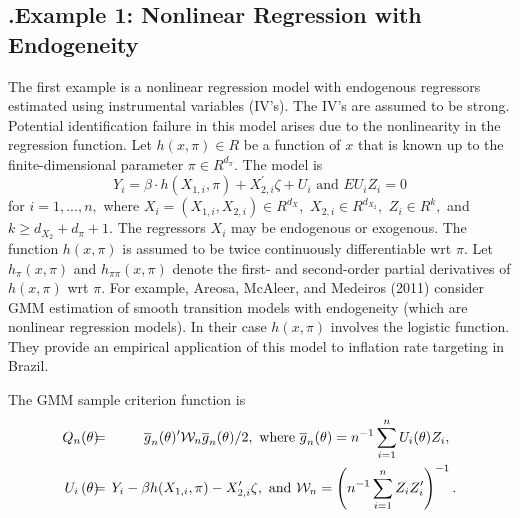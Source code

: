 \documentclass[12pt,titlepage,final,oneside,letterpaper]{article}
\begin{document}
\subsection{\hspace{-0.2in}\textbf{.}\hspace{0.18in}Example 1: Nonlinear
Regression with Endogeneity}

\hspace{0.25in}The first example is a nonlinear regression model with
endogenous regressors estimated using instrumental variables (IV's). The
IV's are assumed to be strong. Potential identification failure in this
model arises due to the nonlinearity in the regression function. Let $%
h(x,\pi )\in R$ be a function of $x$ that is known up to the
finite-dimensional parameter $\pi \in R^{d_{\pi }}.$ The model is%
\begin{equation}
Y_{i}=\beta \cdot h\left( X_{1,i},\pi \right) +X_{2,i}^{\prime }\zeta +U_{i}%
\text{ and }EU_{i}Z_{i}=0
\end{equation}%
for $i=1,...,n,$ where $X_{i}=(X_{1,i},X_{2,i})\in R^{d_{X}},$ $X_{2,i}\in
R^{d_{X_{2}}},$ $Z_{i}\in R^{k},$ and $k\geq d_{X_{2}}+d_{\pi }+1.$ The
regressors $X_{i}$ may be endogenous or exogenous. The function $h(x,\pi )$
is assumed to be twice continuously differentiable wrt $\pi .$ Let $h_{\pi
}(x,\pi )$ and $h_{\pi \pi }(x,\pi )$ denote the first- and second-order
partial derivatives of $h(x,\pi )$ wrt $\pi .$ For example, Areosa, McAleer,
and Medeiros (2011) consider GMM estimation of smooth transition models with
endogeneity (which are nonlinear regression models). In their case $h(x,\pi
) $ involves the logistic function. They provide an empirical application of
this model to inflation rate targeting in Brazil.

The GMM sample criterion function is%
\begin{eqnarray}
Q_{n}(\theta )\hspace{-0.08in} &=&\hspace{-0.08in}\overline{g}_{n}(\theta
)^{\prime }\mathcal{W}_{n}\overline{g}_{n}(\theta )/2,\text{ where }%
\overline{g}_{n}(\theta )=n^{-1}\sum_{i=1}^{n}U_{i}(\theta )Z_{i},\text{ } 
\notag \\
U_{i}\left( \theta \right) \hspace{-0.08in} &=&\hspace{-0.08in}Y_{i}-\beta
h(X_{1,i},\pi )-X_{2,i}^{\prime }\zeta ,\text{ and }\mathcal{W}_{n}=\left(
n^{-1}\sum_{i=1}^{n}Z_{i}Z_{i}^{\prime }\right) ^{-1}.  \label{gmm CF}
\end{eqnarray}
\end{document}
